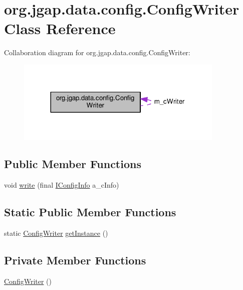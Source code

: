 \hypertarget{classorg_1_1jgap_1_1data_1_1config_1_1_config_writer}{\section{org.\-jgap.\-data.\-config.\-Config\-Writer Class Reference}
\label{classorg_1_1jgap_1_1data_1_1config_1_1_config_writer}
}


Collaboration diagram for org.\-jgap.\-data.\-config.\-Config\-Writer\-:
\nopagebreak
\begin{figure}[H]
\begin{center}
\leavevmode
\includegraphics[width=281pt]{classorg_1_1jgap_1_1data_1_1config_1_1_config_writer__coll__graph}
\end{center}
\end{figure}
\subsection*{Public Member Functions}
\begin{DoxyCompactItemize}
\item 
void \hyperlink{classorg_1_1jgap_1_1data_1_1config_1_1_config_writer_a91f0e172198271c26e2781d828ce8920}{write} (final \hyperlink{interfaceorg_1_1jgap_1_1data_1_1config_1_1_i_config_info}{I\-Config\-Info} a\-\_\-c\-Info)
\end{DoxyCompactItemize}
\subsection*{Static Public Member Functions}
\begin{DoxyCompactItemize}
\item 
static \hyperlink{classorg_1_1jgap_1_1data_1_1config_1_1_config_writer}{Config\-Writer} \hyperlink{classorg_1_1jgap_1_1data_1_1config_1_1_config_writer_a13ee631b8b426a67a471cc7690d8a5a3}{get\-Instance} ()
\end{DoxyCompactItemize}
\subsection*{Private Member Functions}
\begin{DoxyCompactItemize}
\item 
\hyperlink{classorg_1_1jgap_1_1data_1_1config_1_1_config_writer_a3f1c059365fcfdbdaa8994b3004434d8}{Config\-Writer} ()
\end{DoxyCompactItemize}
